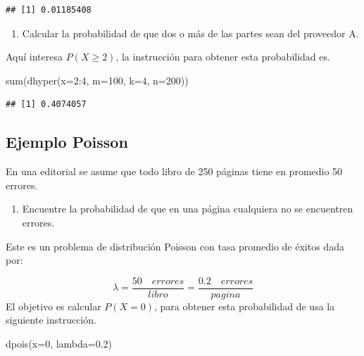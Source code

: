 \documentclass[
]{book}
\makeatletter
\newenvironment{Shaded}{\begin{snugshade}}{\end{snugshade}}
\newcommand{\AttributeTok}[1]{\textcolor[rgb]{0.77,0.63,0.00}{#1}}
\newcommand{\DecValTok}[1]{\textcolor[rgb]{0.00,0.00,0.81}{#1}}
\newcommand{\FloatTok}[1]{\textcolor[rgb]{0.00,0.00,0.81}{#1}}
\newcommand{\FunctionTok}[1]{\textcolor[rgb]{0.00,0.00,0.00}{#1}}
\newcommand{\NormalTok}[1]{#1}
\newcommand{\SpecialCharTok}[1]{\textcolor[rgb]{0.00,0.00,0.00}{#1}}
\providecommand{\tightlist}{%
  \setlength{\itemsep}{0pt}\setlength{\parskip}{0pt}}
\newenvironment{kframe}{%
\medskip{}
\setlength{\fboxsep}{.8em}
 \def\at@end@of@kframe{}%
 \ifinner\ifhmode%
  \def\at@end@of@kframe{\end{minipage}}%
  \begin{minipage}{\columnwidth}%
 \fi\fi%
 \def\FrameCommand##1{\hskip\@totalleftmargin \hskip-\fboxsep
 \colorbox{shadecolor}{##1}\hskip-\fboxsep
     \hskip-\linewidth \hskip-\@totalleftmargin \hskip\columnwidth}%
 \MakeFramed {\advance\hsize-\width
   \@totalleftmargin\z@ \linewidth\hsize
   \@setminipage}}%
 {\par\unskip\endMakeFramed%
 \at@end@of@kframe}
\renewenvironment{Shaded}{\begin{kframe}}{\end{kframe}}
\makeatother
\begin{document}
\begin{verbatim}
## [1] 0.01185408
\end{verbatim}

\begin{enumerate}
\def\labelenumi{\arabic{enumi})}
\setcounter{enumi}{1}
\tightlist
\item
  Calcular la probabilidad de que dos o más de las partes sean del proveedor A.
\end{enumerate}

Aquí interesa \(P(X \geq 2)\), la instrucción para obtener esta probabilidad es.

\begin{Shaded}
\begin{Highlighting}[]
\FunctionTok{sum}\NormalTok{(}\FunctionTok{dhyper}\NormalTok{(}\AttributeTok{x=}\DecValTok{2}\SpecialCharTok{:}\DecValTok{4}\NormalTok{, }\AttributeTok{m=}\DecValTok{100}\NormalTok{, }\AttributeTok{k=}\DecValTok{4}\NormalTok{, }\AttributeTok{n=}\DecValTok{200}\NormalTok{))}
\end{Highlighting}
\end{Shaded}

\begin{verbatim}
## [1] 0.4074057
\end{verbatim}

\hypertarget{ejemplo-poisson}{%
\subsection*{Ejemplo Poisson}\label{ejemplo-poisson}}

En una editorial se asume que todo libro de 250 páginas tiene en promedio 50 errores.

\begin{enumerate}
\def\labelenumi{\arabic{enumi})}
\tightlist
\item
  Encuentre la probabilidad de que en una página cualquiera no se encuentren errores.
\end{enumerate}

Este es un problema de distribución Poisson con tasa promedio de éxitos dada por:

\[\lambda=\frac{50 \quad errores}{libro}=\frac{0.2 \quad errores}{pagina}\]
El objetivo es calcular \(P(X=0)\), para obtener esta probabilidad de usa la siguiente instrucción.

\begin{Shaded}
\begin{Highlighting}[]
\FunctionTok{dpois}\NormalTok{(}\AttributeTok{x=}\DecValTok{0}\NormalTok{, }\AttributeTok{lambda=}\FloatTok{0.2}\NormalTok{)}
\end{Highlighting}
\end{Shaded}
\end{document}
